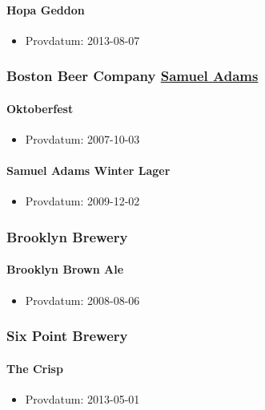 \documentclass[11pt]{article}
\begin{document}
\paragraph{Hopa Geddon}
\label{sec:orgb16e1e9}
\begin{itemize}
\item Provdatum: 2013-08-07
\end{itemize}
\subsubsection{Boston Beer Company \underline{Samuel Adams}}
\label{sec:org93f5a6b}
\paragraph{Oktoberfest}
\label{sec:orgba6d1ed}
\begin{itemize}
\item Provdatum: 2007-10-03
\end{itemize}
\paragraph{Samuel Adams Winter Lager}
\label{sec:orgd3e0035}
\begin{itemize}
\item Provdatum: 2009-12-02
\end{itemize}
\subsubsection{Brooklyn Brewery}
\label{sec:orga8e683a}
\paragraph{Brooklyn Brown Ale}
\label{sec:org9b47f29}
\begin{itemize}
\item Provdatum: 2008-08-06
\end{itemize}
\subsubsection{Six Point Brewery}
\label{sec:org28b7b1b}
\paragraph{The Crisp}
\label{sec:org853b88f}
\begin{itemize}
\item Provdatum: 2013-05-01
\end{itemize}
\end{document}
